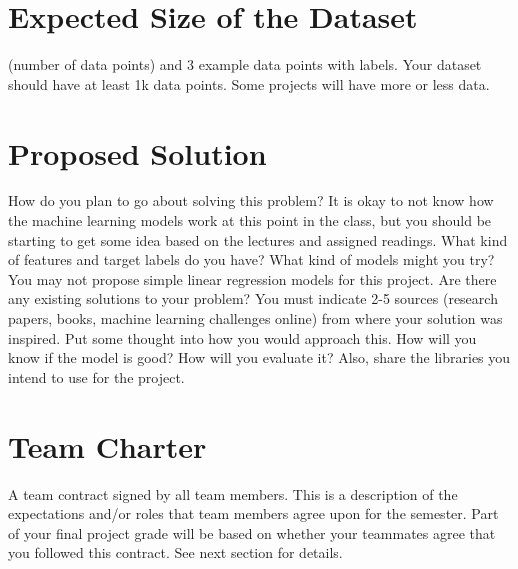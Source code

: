 \documentclass{article}
\begin{document}
\section{Expected Size of the Dataset}
(number of data points) and 3 example data points with labels. Your dataset should have at least 1k data points. Some projects will have more or less data. \\

\section{Proposed Solution}
How do you plan to go about solving this problem? It is okay to not know
how the machine learning models work at this point in the class, but you should be starting to get some idea based on the lectures and assigned readings. What kind of features and target labels do you have? What kind of models might you try? You may not propose simple linear regression models for this project. Are there any existing solutions to your problem?
You must indicate 2-5 sources (research papers, books, machine learning challenges online) from where your solution was inspired. Put some thought into how you would approach this. How will you know if the model is good? How will you evaluate it? Also, share the libraries you intend to use for the project. \\

\newpage
\section{Team Charter}
A team contract signed by all team members. This is a description of the expectations and/or roles that team members agree upon for the semester. Part of your final project grade will be based on whether your teammates agree that you followed this contract. See next section for details.
\end{document}
